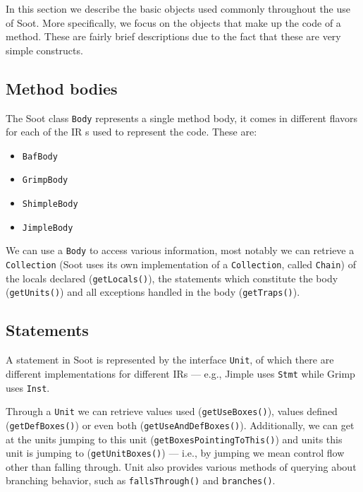 \documentclass{article}
\newcommand{\code}[1]{\texttt{\small #1}}
\begin{document}
In this section we describe the basic objects used commonly throughout
the use of Soot. More specifically, we focus on the objects that make
up the code of a method. These are fairly brief descriptions due to
the fact that these are very simple constructs.


\subsection{Method bodies}

The Soot class \code{Body} represents a single method body, it comes
in different flavors for each of the IR s used to represent the
code. These are:
\begin{itemize}
\item \code{BafBody}
\item \code{GrimpBody}
\item \code{ShimpleBody}
\item \code{JimpleBody}
\end{itemize}
We can use a \code{Body} to access various information, most notably
we can retrieve a \code{Collection} (Soot uses its own implementation
of a \code{Collection}, called \code{Chain}) of the locals declared
(\code{getLocals()}), the statements which constitute the body
(\code{getUnits()}) and all exceptions handled in the body
(\code{getTraps()}).

\subsection{Statements}

A statement in Soot is represented by the interface \code{Unit}, of
which there are different implementations for different IRs --- e.g.,
Jimple uses \code{Stmt} while Grimp uses \code{Inst}.

Through a \code{Unit} we can retrieve values used
(\code{getUseBoxes()}), values defined (\code{getDefBoxes()}) or even
both (\code{getUseAndDefBoxes()}). Additionally, we can get at the
units jumping to this unit (\code{getBoxesPointingToThis()}) and units
this unit is jumping to (\code{getUnitBoxes()}) --- i.e., by jumping
we mean control flow other than falling through. Unit also provides
various methods of querying about branching behavior, such as
\code{fallsThrough()} and \code{branches()}.
\end{document}
